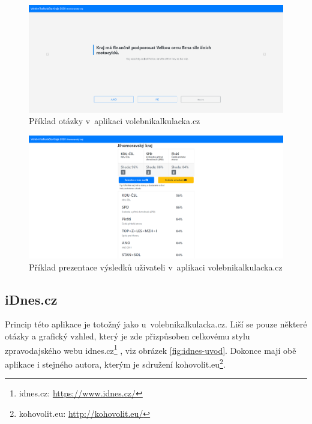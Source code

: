 \begin{figure}
    \centering
    \includegraphics[width=1\textwidth]{obrazky-figures/volebnikalkulacka-otazka.png}
    \caption{Příklad otázky v~aplikaci volebnikalkulacka.cz}
    \label{fig:volebnikalkulacka-otazka}
\end{figure}

\begin{figure}
    \centering
    \includegraphics[width=1\textwidth]{obrazky-figures/volebnikalkulacka-vysledky.png}
    \caption{Příklad prezentace výsledků uživateli v~aplikaci volebnikalkulacka.cz}
    \label{fig:volebnikalkulacka-vysledky}
\end{figure}




\subsection{iDnes.cz}
Princip této aplikace je totožný jako u~volebnikalkulacka.cz. Liší se pouze některé otázky a grafický vzhled, který je zde přizpůsoben celkovému stylu zpravodajského webu idnes.cz\footnote{idnes.cz: \url{https://www.idnes.cz/}} , viz obrázek \ref{fig:idnes-uvod}. Dokonce mají obě aplikace i stejného autora, kterým je sdružení \mbox{kohovolit.eu}\footnote{kohovolit.eu: \url{http://kohovolit.eu/}}.

